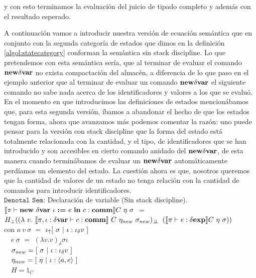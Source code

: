 \noindent
y con esto terminamos la evaluaci\'on del juicio de tipado completo y adem\'as con 
el resultado esperado.

A continuaci\'on vamos a introducir nuestra versi\'on de ecuaci\'on sem\'antica
que en conjunto con la segunda categor\'ia de estados que dimos en la definici\'on 
\ref{algol:statecategory} conforman la sem\'antica
sin stack discipline. Lo que pretendemos con esta sem\'antica ser\'ia, que al
terminar de evaluar el comando $\textbf{new} \delta \textbf{var}$ no exista compactaci\'on del
almac\'en, a diferencia de lo que paso en el ejemplo anterior que al terminar de evaluar
un comando $\textbf{new} \delta \textbf{var}$ el siguiente comando no sabe nada acerca de los
identificadores y valores a los que se evalu\'o.\\

En el momento en que introducimos las definiciones de estados mencion\'abamos 
que, para esta segunda versi\'on, \'ibamos a abandonar el hecho de que los estados tengan
forma, ahora que avanzamos m\'as podemos comentar la raz\'on: uno puede pensar para la
versi\'on con stack discipline que la forma del estado est\'a totalmente relacionada
con la cantidad, y el tipo, de identificadores que se han introducido y son accesibles
en cierto comando anidado del $\textbf{new} \delta \textbf{var}$, de esta manera cuando termin\'abamos 
de evaluar un $\textbf{new} \delta \textbf{var}$ autom\'aticamente perd\'iamos un elemento del estado.
La cuesti\'on ahora es que, nosotros queremos que la cantidad de valores de un
estado no tenga relaci\'on con la cantidad de comandos para introducir identificadores.\\

\noindent
$\texttt{Denotal Sem:}$ Declaraci\'on de variable (Sin stack discipline).\\

$\llbracket \pi \vdash \textbf{new} \ \delta \textbf{var} \ \iota \ \textbf{:=} \ e \ \textbf{in} \ c : \textbf{comm} \rrbracket C \ \eta \ \sigma$ 
$=$ \\ \indent \indent
$H_{\bot} ((\lambda \ v . \ \semBrcks{\pi,\iota:\deltavar \vdash c : \commt}
		\ C \ \eta_{new} \ \sigma_{new})_{\dbot}$
$(\semBrcks{\pi \vdash e : \deltaexp}C \ \eta \ \sigma))$\\

con 
$a \ v \ \sigma$ $=$ $\iota_{\uparrow} [ \ \sigma \ | \ \iota:\iota_{\delta} v \ ] $\\
\indent \indent \ \
$e \ \sigma$ $=$ $(\lambda v . v)_{\delta}\sigma \iota$\\
\indent \indent \ \
$\sigma_{new} = [ \ \sigma \ | \ \iota:\iotadelta v \ ]$\\
\indent \indent \ \
$\eta_{new} = [ \ \eta \ | \ \iota:\lrangles{a,e} \ ]$\\
\indent \indent \ \
$H = 1_C$\\

